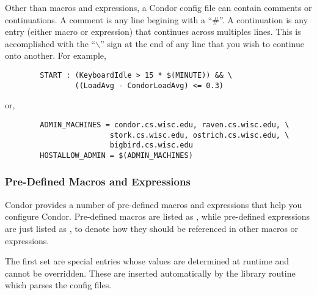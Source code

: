 Other than macros and expressions, a Condor config file can contain
comments or continuations.  A comment is any line begining with a
``\#''.  A continuation is any entry (either macro or expression) that
continues across multiples lines.  This is accomplished with the
``$\backslash$'' sign at the end of any line that you wish to continue onto
another.  For example,

\begin{verbatim}
        START : (KeyboardIdle > 15 * $(MINUTE)) && \
                ((LoadAvg - CondorLoadAvg) <= 0.3)
\end{verbatim}

or,

\begin{verbatim}
        ADMIN_MACHINES = condor.cs.wisc.edu, raven.cs.wisc.edu, \
                        stork.cs.wisc.edu, ostrich.cs.wisc.edu, \
                        bigbird.cs.wisc.edu
        HOSTALLOW_ADMIN = $(ADMIN_MACHINES)
\end{verbatim}

\subsubsection{Pre-Defined Macros and Expressions}
\label{sec:Pre-Defined-Macros-and-Expressions}

Condor provides a number of pre-defined macros and expressions that
help you configure Condor.  Pre-defined macros are listed as
, while pre-defined expressions are just listed as
\Expr{expression\_name}, to denote how they should be referenced in
other macros or expressions.

The first set are special entries whose values are determined at
runtime and cannot be overridden.  These are inserted automatically by
the library routine which parses the config files.

